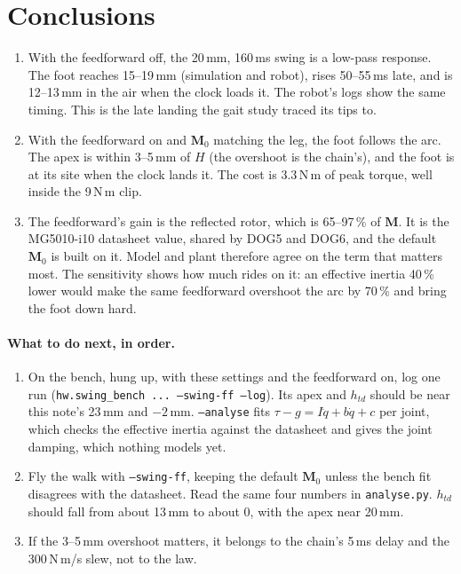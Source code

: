 \documentclass[11pt,a4paper]{article}
\newcommand{\Mmat}{\mathbf{M}}
\newcommand{\Nm}{\,N\,m}
\newcommand{\Nms}{\,N\,m/s}
\newcommand{\code}[1]{\texttt{#1}}
\begin{document}
\section{Conclusions}

\begin{enumerate}[leftmargin=1.5em]
\item With the feedforward off, the 20\,mm, 160\,ms swing is a low-pass
response. The foot reaches 15--19\,mm (simulation and robot), rises 50--55\,ms
late, and is 12--13\,mm in the air when the clock loads it. The robot's logs
show the same timing. This is the late landing the gait study traced its tips
to.
\item With the feedforward on and $\Mmat_0$ matching the leg, the foot follows
the arc. The apex is within 3--5\,mm of $H$ (the overshoot is the chain's), and
the foot is at its site when the clock lands it. The cost is 3.3\Nm{} of peak
torque, well inside the 9\Nm{} clip.
\item The feedforward's gain is the reflected rotor, which is 65--97\,\% of
$\Mmat$. It is the MG5010-i10 datasheet value, shared by DOG5 and DOG6, and the
default $\Mmat_0$ is built on it. Model and plant therefore agree on the term
that matters most. The sensitivity shows how much rides on it: an effective
inertia 40\,\% lower would make the same feedforward overshoot the arc by
70\,\% and bring the foot down hard.
\end{enumerate}

\paragraph{What to do next, in order.}
\begin{enumerate}[leftmargin=1.5em]
\item On the bench, hung up, with these settings and the feedforward on, log
one run (\code{hw.swing\_bench ... --swing-ff --log}). Its apex and $h_{td}$
should be near this note's 23\,mm and $-2$\,mm. \code{--analyse} fits
$\tau - g = I\ddot q + b\dot q + c$ per joint, which checks the effective
inertia against the datasheet and gives the joint damping, which nothing
models yet.
\item Fly the walk with \code{--swing-ff}, keeping the default $\Mmat_0$ unless
the bench fit disagrees with the datasheet. Read the same four numbers in
\code{analyse.py}. $h_{td}$ should fall from about 13\,mm to about 0, with the
apex near 20\,mm.
\item If the 3--5\,mm overshoot matters, it belongs to the chain's 5\,ms delay
and the 300\Nms{} slew, not to the law.
\end{enumerate}
\end{document}
